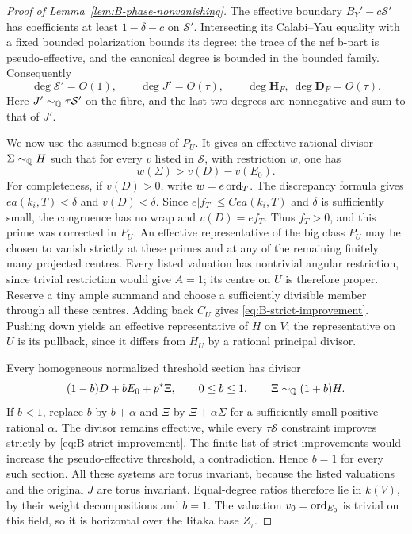 \begin{proof}[Proof of Lemma~\ref{lem:B-phase-nonvanishing}]
The effective boundary $B_Y'-c\mathcal S'$ has coefficients at
least $1-\delta-c$ on $\mathcal S'$.  Intersecting its
Calabi--Yau equality with a fixed bounded polarization bounds
its degree: the trace of the nef b-part is pseudo-effective,
and the canonical degree is bounded in the bounded family.
Consequently
\begin{equation}\label{eq:B-small-degrees}
 \deg\mathcal S'=O(1),\qquad
 \deg J'=O(\tau),\qquad
 \deg\mathbf H_F,\ \deg\mathbf D_F=O(\tau).
\end{equation}
Here $J'\sim_{\mathbb Q}\tau\mathcal S'$ on the fibre, and the last
two degrees are nonnegative and sum to that of $J'$.

We now use the assumed bigness of $P_U$.  It gives an effective
rational divisor $\Sigma\sim_{\mathbb Q}H$ such that for every $v$
listed in $\mathcal S$, with restriction $w$, one has
\begin{equation}\label{eq:B-strict-improvement}
 w(\Sigma)>v(D)-v(E_0).
\end{equation}
For completeness, if $v(D)>0$, write $w=e\operatorname{ord}_T$.
The discrepancy formula gives $ea(k_i,T)<\delta$ and
$v(D)<\delta$.  Since $e|f_T|\le Cea(k_i,T)$ and $\delta$ is
sufficiently small, the congruence has no wrap and
$v(D)=ef_T$.  Thus $f_T>0$, and this prime was corrected in
$P_U$.  An effective representative of the big class $P_U$
may be chosen to vanish strictly at these primes and at any of
the remaining finitely many projected centres.  Every listed
valuation has nontrivial angular restriction, since trivial
restriction would give $A=1$; its centre on $U$ is therefore proper.
Reserve a tiny ample summand and choose a sufficiently divisible
member through all these centres.  Adding back $C_U$ gives
\eqref{eq:B-strict-improvement}.  Pushing down yields an
effective representative of $H$ on $V$; the representative on
$U$ is its pullback, since it differs from $H_U$ by a rational
principal divisor.

Every homogeneous normalized threshold section has divisor
\begin{equation}\label{eq:B-threshold-section}
 (1-b)D+bE_0+p^*\Xi,
 \qquad 0\le b\le1,
 \qquad \Xi\sim_{\mathbb Q}(1+b)H.
\end{equation}
If $b<1$, replace $b$ by $b+\alpha$ and $\Xi$ by
$\Xi+\alpha\Sigma$ for a sufficiently small positive rational
$\alpha$.  The divisor remains effective, while every
$\tau\mathcal S$ constraint improves strictly by
\eqref{eq:B-strict-improvement}.  The finite list of strict
improvements would increase the pseudo-effective threshold,
a contradiction.  Hence $b=1$ for every such section.
All these systems are torus invariant, because the listed
valuations and the original $J$ are torus invariant.  Equal-degree
ratios therefore lie in $k(V)$, by their weight decompositions
and $b=1$.  The valuation
$v_0=\operatorname{ord}_{E_0}$ is trivial on this field, so it is horizontal
over the Iitaka base $Z_\tau$.


\end{proof}
